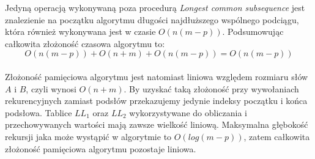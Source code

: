 \documentclass[12pt]{article}
\theoremstyle{definition}
\theoremstyle{definition}
\theoremstyle{definition}
\begin{document}
Jedyną operacją wykonywaną poza procedurą \textit{Longest common subsequence} jest znalezienie na początku algorytmu długości najdłuższego wspólnego podciągu, która również wykonywana jest w czasie $O(n(m - p))$.
Podsumowując całkowita złożoność czasowa algorytmu to:
\[
O(n(m - p)) + O(n + m) + O(n(m - p)) = O(n(m - p))
\]\\

Złożoność pamięciowa algorytmu jest natomiast liniowa względem rozmiaru słów $A$ i $B$, czyli wynosi $O(n + m)$. By uzyskać taką złożoność przy wywołaniach rekurencyjnych zamiast podsłów przekazujemy jedynie indeksy początku i końca podsłowa. Tablice $LL_1$ oraz $LL_2$ wykorzystywane do obliczania i przechowywanych wartości mają zawsze wielkość liniową. Maksymalna głębokość rekursji jaka może wystąpić w algorytmie to $O(log(m-p))$, zatem całkowita złożoność pamięciowa algorytmu pozostaje liniowa.
\end{document}
